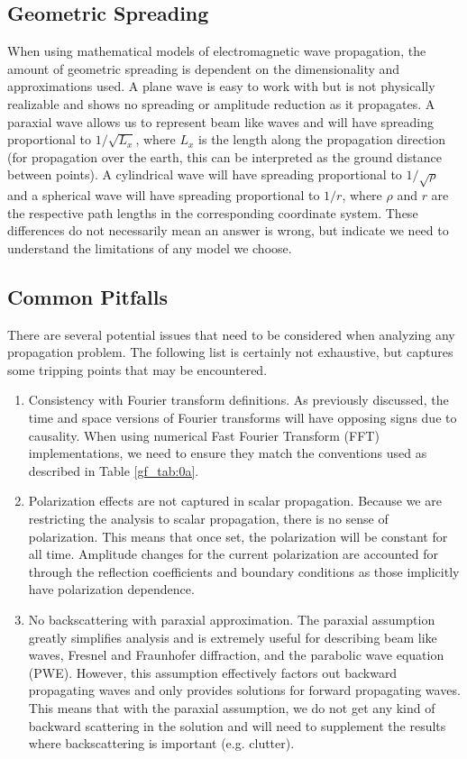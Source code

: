 \subsection{Geometric Spreading}
When using mathematical models of electromagnetic wave propagation, the amount of geometric spreading is dependent on the dimensionality and approximations used. A plane wave is easy to work with but is not physically realizable and shows no spreading or amplitude reduction as it propagates. A paraxial wave allows us to represent beam like waves and will have spreading proportional to $1/\sqrt{L_x}$, where $L_x$ is the length along the propagation direction (for propagation over the earth, this can be interpreted as the ground distance between points). A cylindrical wave will have spreading proportional to $1/\sqrt{\rho}$ and a spherical wave will have spreading proportional to $1/r$, where $\rho$ and $r$ are the respective path lengths in the corresponding coordinate system. These differences do not necessarily mean an answer is wrong, but indicate we need to understand the limitations of any model we choose.

\subsection{Common Pitfalls}
There are several potential issues that need to be considered when analyzing any propagation problem. The following list is certainly not exhaustive, but captures some tripping points that may be encountered.

\begin{enumerate}
\item Consistency with Fourier transform definitions. As previously discussed, the time and space versions of Fourier transforms will have opposing signs due to causality. When using numerical Fast Fourier Transform (FFT) implementations, we need to ensure they match the conventions used as described in Table \ref{gf_tab:0a}.
\item Polarization effects are not captured in scalar propagation. Because we are restricting the analysis to scalar propagation, there is no sense of polarization. This means that once set, the polarization will be constant for all time. Amplitude changes for the current polarization are accounted for through the reflection coefficients and boundary conditions as those implicitly have polarization dependence.
\item No backscattering with paraxial approximation. The paraxial assumption greatly simplifies analysis and is extremely useful for describing beam like waves, Fresnel and Fraunhofer diffraction, and the parabolic wave equation (PWE). However, this assumption effectively factors out backward propagating waves and only provides solutions for forward propagating waves. This means that with the paraxial assumption, we do not get any kind of backward scattering in the solution and will need to supplement the results where backscattering is important (e.g. clutter). 
\end{enumerate}

